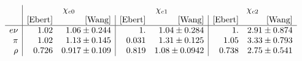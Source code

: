 $$
\begin{array}{r|rr|rr|rr}
  &\multicolumn{2}{c}{\chi_{c0}} & \multicolumn{2}{c}{\chi_{c1}} & \multicolumn{2}{c}{\chi_{c2}} \\
   & \text{[Ebert]} & \text{[Wang]} & \text{[Ebert]} & \text{[Wang]} & \text{[Ebert]} & \text{[Wang]} \\
\hline
 e\nu & 1.02 & 1.06\pm 0.244 & 1. & 1.04\pm 0.284 & 1. & 2.91\pm 0.874 \\
 \pi & 1.02 & 1.13\pm 0.145 & 0.031 & 1.31\pm 0.125 & 1.05 & 3.33\pm 0.793 \\
 \rho & 0.726 & 0.917\pm 0.109 & 0.819 & 1.08\pm 0.0942 & 0.738 & 2.75\pm 0.541 \\
\end{array}
$$